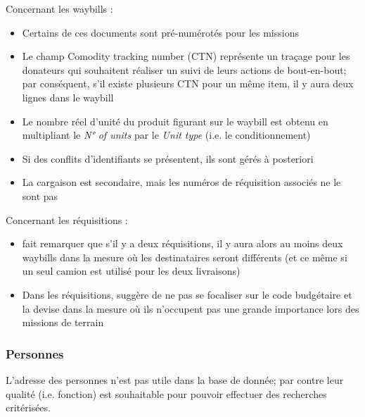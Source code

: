 \documentclass[11pt,fleqn]{report}
\begin{document}
Concernant les waybills :
\begin{itemize}
	\item Certains de ces documents sont pré-numérotés pour les missions
	\item Le champ \og{}Comodity tracking number\fg{} (CTN) représente un traçage pour les donateurs qui souhaitent réaliser un suivi de leurs actions de bout-en-bout; par conséquent, s'il existe plusieurs CTN pour un même item, il y aura deux lignes dans le waybill
	\item Le nombre réel d'unité du produit figurant sur le waybill est obtenu en multipliant le \emph{N° of units} par le \emph{Unit type} (i.e. le conditionnement)
	\item Si des conflits d'identifiants se présentent, ils sont gérés à posteriori
	\item La cargaison est secondaire, mais les numéros de réquisition associés ne le sont pas
\end{itemize}
Concernant les réquisitions :
\begin{itemize}
	\item \mo fait remarquer que s'il y a deux réquisitions, il y aura alors au moins deux waybills dans la mesure où les destinataires seront différents (et ce même si un seul camion est utilisé pour les deux livraisons)
	\item Dans les réquisitions, \mo suggère de ne pas se focaliser sur le code budgétaire et la devise dans la mesure où ils n'occupent pas une grande importance lors des missions de terrain
\end{itemize}



\subsubsection{Personnes}

L'adresse des personnes n'est pas utile dans la base de donnée; par contre leur qualité (i.e. fonction) est souhaitable pour pouvoir effectuer des recherches critérisées.

\end{document}
